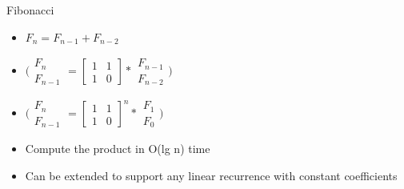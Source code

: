 \documentclass{beamer}
\begin{document}
\begin{frame}[<+->]{Fibonacci}
  \begin{block}{}
    \begin{itemize}
      \item $F_n = F_{n-1} + F_{n-2}$
      \item $\bigl(\begin{smallmatrix} F_n\\ F_{n-1} \end{smallmatrix} = [\begin{smallmatrix} 1&1\\ 1&0 \end{smallmatrix}] * \begin{smallmatrix} F_{n-1}\\ F_{n-2} \end{smallmatrix}\bigr)$
      \item $\bigl(\begin{smallmatrix} F_n\\ F_{n-1} \end{smallmatrix} = {[\begin{smallmatrix} 1&1\\ 1&0 \end{smallmatrix}]}^n * \begin{smallmatrix} F_{1}\\ F_{0} \end{smallmatrix}\bigr)$
      \item Compute the product in O(lg n) time
      \item \alert{Can be extended to support any linear recurrence with constant coefficients}
    \end{itemize}
  \end{block}
\end{frame}
\end{document}
